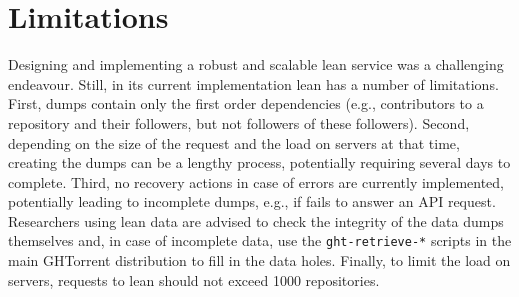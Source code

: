 
\section{Limitations}
\label{sec:limitations}

Designing and implementing a robust and scalable lean \ght service was a challenging endeavour.
Still, in its current implementation lean \ght has a number of limitations.
First, dumps contain only the first order dependencies (e.g., contributors to a repository and their followers, but not followers of these
followers).
Second, depending on the size of the request and the load on \ght servers at that time, creating the dumps
can be a lengthy process, potentially requiring several days to complete.
Third, no recovery actions in case of errors are currently implemented, potentially leading to incomplete dumps,
e.g., if \gh fails to answer an API request.
Researchers using lean \ght data are advised to check the integrity of the data dumps themselves and, 
in case of incomplete data, use the \texttt{ght-retrieve-*} scripts in the
main GHTorrent distribution to fill in the data holes.
Finally, to limit the load on \ght servers, requests to lean \ght should not exceed 1000 repositories.

